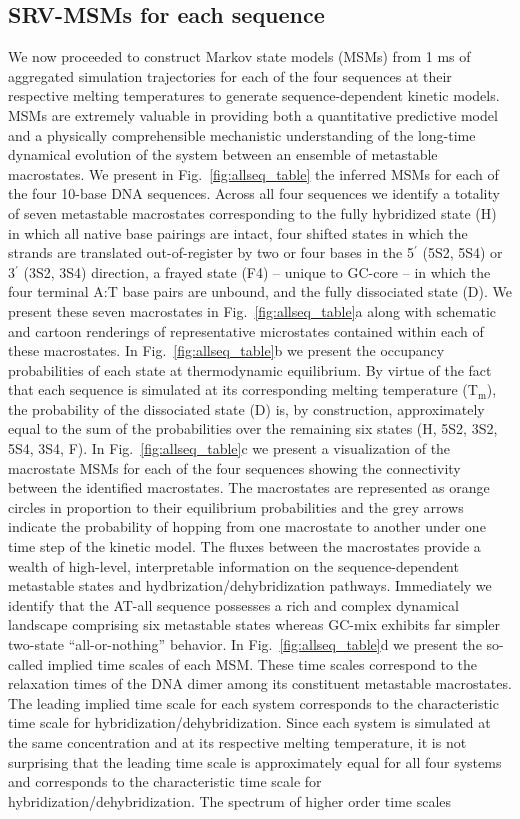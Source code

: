 \documentclass[journal=jpcbfk,manuscript=article]{achemso}
\begin{document}
\subsection{SRV-MSMs for each sequence}

We now proceeded to construct Markov state models (MSMs) from 1 ms of aggregated simulation trajectories for each of the four sequences at their respective melting temperatures to generate sequence-dependent kinetic models. MSMs are extremely valuable in providing both a quantitative predictive model and a physically comprehensible mechanistic understanding of the long-time dynamical evolution of the system between an ensemble of metastable macrostates. We present in Fig.~\ref{fig:allseq_table} the inferred MSMs for each of the four 10-base DNA sequences. Across all four sequences we identify a totality of seven metastable macrostates corresponding to the fully hybridized state (H) in which all native base pairings are intact, four shifted states in which the strands are translated out-of-register by two or four bases in the 5$^\prime$ (5S2, 5S4) or 3$^\prime$ (3S2, 3S4) direction, a frayed state (F4) -- unique to GC-core -- in which the four terminal A:T base pairs are unbound, and the fully dissociated state (D). We present these seven macrostates in Fig.~\ref{fig:allseq_table}a along with schematic and cartoon renderings of representative microstates contained within each of these macrostates. In Fig.~\ref{fig:allseq_table}b we present the occupancy probabilities of each state at thermodynamic equilibrium. By virtue of the fact that each sequence is simulated at its corresponding melting temperature (T$_\mathrm{m}$), the probability of the dissociated state (D) is, by construction, approximately equal to the sum of the probabilities over the remaining six states (H, 5S2, 3S2, 5S4, 3S4, F). In Fig.~\ref{fig:allseq_table}c we present a visualization of the macrostate MSMs for each of the four sequences showing the connectivity between the identified macrostates. The macrostates are represented as orange circles in proportion to their equilibrium probabilities and the grey arrows indicate the probability of hopping from one macrostate to another under one time step of the kinetic model. The fluxes between the macrostates provide a wealth of high-level, interpretable information on the sequence-dependent metastable states and hydbrization/dehybridization pathways. Immediately we identify that the AT-all sequence possesses a rich and complex dynamical landscape comprising six metastable states whereas GC-mix exhibits far simpler two-state ``all-or-nothing'' behavior. In Fig.~\ref{fig:allseq_table}d we present the so-called implied time scales of each MSM. These time scales correspond to the relaxation times of the DNA dimer among its constituent metastable macrostates. The leading implied time scale for each system corresponds to the characteristic time scale for hybridization/dehybridization. Since each system is simulated at the same concentration and at its respective melting temperature, it is not surprising that the leading time scale is approximately equal for all four systems and corresponds to the characteristic time scale for hybridization/dehybridization. The spectrum of higher order time scales 
\end{document}
